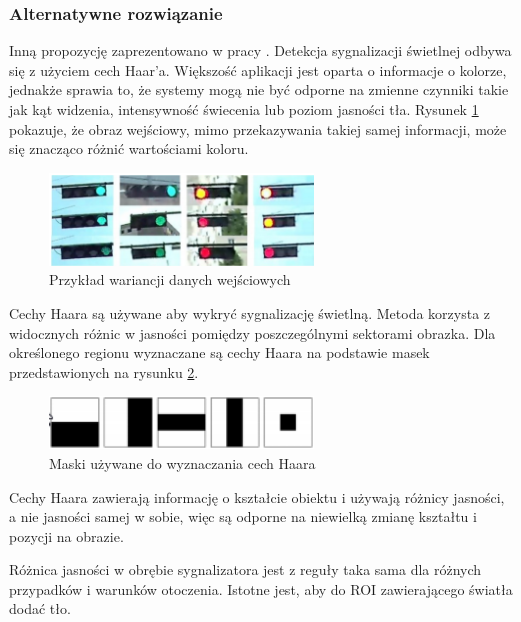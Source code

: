 \subsubsection{Alternatywne rozwiązanie}

Inną propozycję zaprezentowano w pracy \cite{T9}. 
Detekcja sygnalizacji świetlnej odbywa się z użyciem cech Haar'a.
Większość aplikacji jest oparta o informacje o kolorze, jednakże sprawia to, że systemy mogą nie być odporne na zmienne czynniki takie jak kąt widzenia, intensywność świecenia lub poziom jasności tła.
Rysunek \ref{fig:traffic_light2_input} pokazuje, że obraz wejściowy, mimo przekazywania takiej samej informacji, może się znacząco różnić wartościami koloru.

\begin{figure}
  \centering
  \includegraphics[width=7cm]{img/traffic_light2_input.png}
  \caption{Przykład wariancji danych wejściowych\cite{T9}}
  \label{fig:traffic_light2_input}
\end{figure}

Cechy Haara są używane aby wykryć sygnalizację świetlną. 
Metoda korzysta z widocznych różnic w jasności pomiędzy poszczególnymi sektorami obrazka.
Dla określonego regionu wyznaczane są cechy Haara na podstawie masek przedstawionych na rysunku \ref{fig:maski_maseczki}.

\begin{figure}
  \centering
  \includegraphics[width=7cm]{img/maski_maseczki.png}
  \caption{Maski używane do wyznaczania cech Haara\cite{T9}}
  \label{fig:maski_maseczki}
\end{figure}

Cechy Haara zawierają informację o kształcie obiektu i używają różnicy jasności, a nie jasności samej w sobie, więc są odporne na niewielką zmianę kształtu  i pozycji na obrazie.

Różnica jasności w obrębie sygnalizatora jest z reguły taka sama dla różnych przypadków i warunków otoczenia. 
Istotne jest, aby do ROI zawierającego światła dodać tło. 

